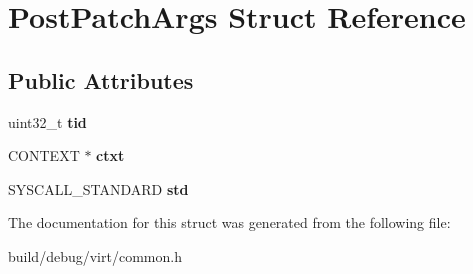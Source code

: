 \hypertarget{structPostPatchArgs}{\section{Post\-Patch\-Args Struct Reference}
\label{structPostPatchArgs}
}
\subsection*{Public Attributes}
\begin{DoxyCompactItemize}
\item 
\hypertarget{structPostPatchArgs_a7181ce6b42d7c4716ce4d2d2893eb209}{uint32\-\_\-t {\bfseries tid}}\label{structPostPatchArgs_a7181ce6b42d7c4716ce4d2d2893eb209}

\item 
\hypertarget{structPostPatchArgs_a5d96ad2e38751553f6242017c5fa2bcf}{C\-O\-N\-T\-E\-X\-T $\ast$ {\bfseries ctxt}}\label{structPostPatchArgs_a5d96ad2e38751553f6242017c5fa2bcf}

\item 
\hypertarget{structPostPatchArgs_ac52015e749f0f60c5a3c30b0d32f9a23}{S\-Y\-S\-C\-A\-L\-L\-\_\-\-S\-T\-A\-N\-D\-A\-R\-D {\bfseries std}}\label{structPostPatchArgs_ac52015e749f0f60c5a3c30b0d32f9a23}

\end{DoxyCompactItemize}


The documentation for this struct was generated from the following file\-:\begin{DoxyCompactItemize}
\item 
build/debug/virt/common.\-h\end{DoxyCompactItemize}
